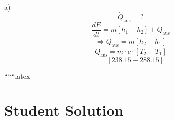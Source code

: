 a) \\
\[
\dot{Q}_{\text{aus}} = ?
\]
\[
\frac{dE}{dt} = \dot{m} \left[ h_1 - h_2 \right] + \dot{Q}_{\text{aus}}
\]
\[
\Rightarrow \dot{Q}_{\text{aus}} = \dot{m} \left[ h_2 - h_1 \right]
\]
\[
\dot{Q}_{\text{aus}} = m \cdot c \cdot \left[ T_2 - T_1 \right]
\]
\[
= \left[ 238.15 - 288.15 \right]
\]

``````latex


\section*{Student Solution}